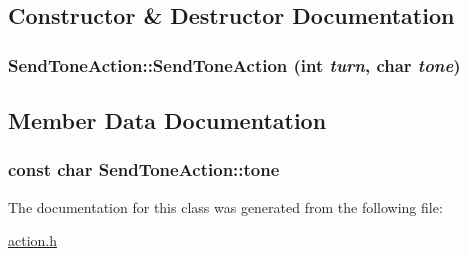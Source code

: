 \subsection{Constructor \& Destructor Documentation}
\hypertarget{classSendToneAction_462b5171c72469683ab2d94e678cb955}{
\subsubsection[{SendToneAction}]{\setlength{\rightskip}{0pt plus 5cm}SendToneAction::SendToneAction (int {\em turn}, \/  char {\em tone})}}
\label{classSendToneAction_462b5171c72469683ab2d94e678cb955}




\subsection{Member Data Documentation}
\hypertarget{classSendToneAction_971b5f50b925ee5e3ace27c909c0c3f9}{
\subsubsection[{tone}]{\setlength{\rightskip}{0pt plus 5cm}const char {\bf SendToneAction::tone}}}
\label{classSendToneAction_971b5f50b925ee5e3ace27c909c0c3f9}




The documentation for this class was generated from the following file:\begin{CompactItemize}
\item 
\hyperlink{action_8h}{action.h}\end{CompactItemize}
